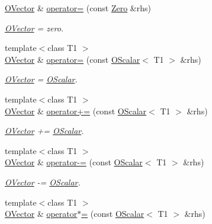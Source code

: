 \begin{DoxyCompactItemize}
\mbox{\hyperlink{classENSEM_1_1OVector}{O\+Vector}} \& \mbox{\hyperlink{classENSEM_1_1OVector_a54123bea722ddb2b3eaea0c948735b13}{operator=}} (const \mbox{\hyperlink{structENSEM_1_1Zero}{Zero}} \&rhs)
\begin{DoxyCompactList}\small\item\em \mbox{\hyperlink{classENSEM_1_1OVector}{O\+Vector}} = zero. \end{DoxyCompactList}\item 
{\footnotesize template$<$class T1 $>$ }\\\mbox{\hyperlink{classENSEM_1_1OVector}{O\+Vector}} \& \mbox{\hyperlink{classENSEM_1_1OVector_a31b08dda73879d2a39c4a0bec90bc401}{operator=}} (const \mbox{\hyperlink{classENSEM_1_1OScalar}{O\+Scalar}}$<$ T1 $>$ \&rhs)
\begin{DoxyCompactList}\small\item\em \mbox{\hyperlink{classENSEM_1_1OVector}{O\+Vector}} = \mbox{\hyperlink{classENSEM_1_1OScalar}{O\+Scalar}}. \end{DoxyCompactList}\item 
{\footnotesize template$<$class T1 $>$ }\\\mbox{\hyperlink{classENSEM_1_1OVector}{O\+Vector}} \& \mbox{\hyperlink{classENSEM_1_1OVector_a6cb710cbb29083f2849c48da65292174}{operator+=}} (const \mbox{\hyperlink{classENSEM_1_1OScalar}{O\+Scalar}}$<$ T1 $>$ \&rhs)
\begin{DoxyCompactList}\small\item\em \mbox{\hyperlink{classENSEM_1_1OVector}{O\+Vector}} += \mbox{\hyperlink{classENSEM_1_1OScalar}{O\+Scalar}}. \end{DoxyCompactList}\item 
{\footnotesize template$<$class T1 $>$ }\\\mbox{\hyperlink{classENSEM_1_1OVector}{O\+Vector}} \& \mbox{\hyperlink{classENSEM_1_1OVector_ae2ae62360c5eb29827cb7e3d5556859f}{operator-\/=}} (const \mbox{\hyperlink{classENSEM_1_1OScalar}{O\+Scalar}}$<$ T1 $>$ \&rhs)
\begin{DoxyCompactList}\small\item\em \mbox{\hyperlink{classENSEM_1_1OVector}{O\+Vector}} -\/= \mbox{\hyperlink{classENSEM_1_1OScalar}{O\+Scalar}}. \end{DoxyCompactList}\item 
{\footnotesize template$<$class T1 $>$ }\\\mbox{\hyperlink{classENSEM_1_1OVector}{O\+Vector}} \& \mbox{\hyperlink{classENSEM_1_1OVector_a55710cffaf6c877d2465af80ad8b6c49}{operator$\ast$=}} (const \mbox{\hyperlink{classENSEM_1_1OScalar}{O\+Scalar}}$<$ T1 $>$ \&rhs)

\end{DoxyCompactItemize}
